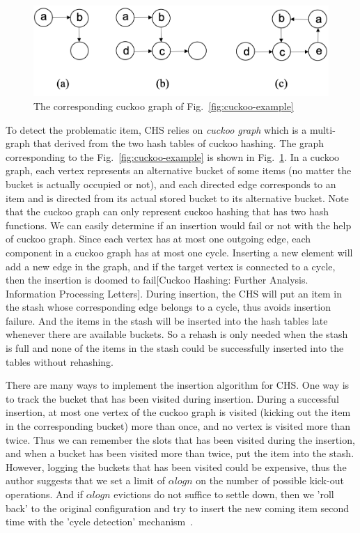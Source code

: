 \documentclass[12pt,conference,compsoc]{IEEEtran}
\begin{document}
\begin{figure}
    \centering
    \includegraphics[width=\linewidth]{cuckoo-graph.png}
    \caption{The corresponding cuckoo graph of Fig.~\ref{fig:cuckoo-example}
    } \label{fig:cuckoo-graph}
\end{figure}

To detect the problematic item, CHS relies on \textit{cuckoo graph} which is a multi-graph that derived from the two hash tables of cuckoo hashing. The graph corresponding to the Fig.~\ref{fig:cuckoo-example} is shown in Fig.~\ref{fig:cuckoo-graph}. In a cuckoo graph, each vertex represents an alternative bucket of some items (no matter the bucket is actually occupied or not), and each directed edge corresponds to an item and is directed from its actual stored bucket to its alternative bucket. Note that the cuckoo graph can only represent cuckoo hashing that has two hash functions. We can easily determine if an insertion would fail or not with the help of cuckoo graph. Since each vertex has at most one outgoing edge, each component in a cuckoo graph has at most one cycle. Inserting a new element will add a new edge in the graph, and if the target vertex is connected to a cycle, then the insertion is doomed to fail[Cuckoo Hashing: Further Analysis. Information Processing Letters]. During insertion, the CHS will put an item in the stash whose corresponding edge belongs to a cycle, thus avoids insertion failure. And the items in the stash will be inserted into the hash tables late whenever there are available buckets. So a rehash is only needed when the stash is full and none of the items in the stash could be successfully inserted into the tables without rehashing.

There are many ways to implement the insertion algorithm for CHS. One way is to track the bucket that has been visited during insertion. During a successful insertion, at most one vertex of the cuckoo graph is visited (kicking out the item in the corresponding bucket) more than once, and no vertex is visited more than twice. Thus we can remember the slots that has been visited during the insertion, and when a bucket has been visited more than twice, put the item into the stash. However, logging the buckets that has been visited could be expensive, thus the author suggests that we set a limit of $\alpha logn$ on the number of possible kick-out operations. And if $\alpha logn$ evictions do not suffice to settle down, then we 'roll back' to the original configuration and try to insert the new coming item second time with the 'cycle detection' mechanism~\cite{CHS}.
\end{document}
